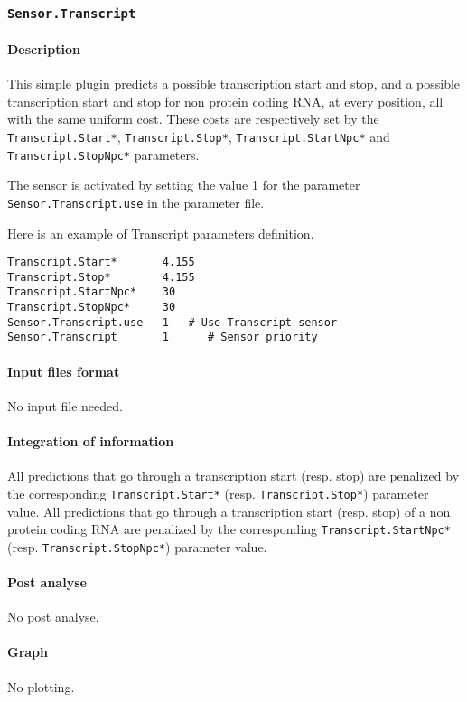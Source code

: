 
\subsubsection{\texttt{Sensor.Transcript}}

\paragraph{Description}

This simple plugin predicts a possible transcription start and stop, 
and a possible transcription start and stop for non protein coding RNA, at
every position, all with the same uniform cost. These costs are
respectively set by the \texttt{Transcript.Start*}, 
\texttt{Transcript.Stop*}, \texttt{Transcript.StartNpc*} and 
\texttt{Transcript.StopNpc*} parameters. 

The sensor is activated by setting the value 1 for the parameter
\texttt{Sensor.Transcript.use} in the parameter file. 

Here is an example of Transcript parameters definition.
\begin{Verbatim}[fontsize=\small]
Transcript.Start*       4.155
Transcript.Stop*        4.155
Transcript.StartNpc*    30
Transcript.StopNpc*     30
Sensor.Transcript.use   1   # Use Transcript sensor
Sensor.Transcript       1      # Sensor priority
\end{Verbatim}

\paragraph{Input files format}

No input file needed.

\paragraph{Integration of information}

All predictions that go through a transcription start (resp. stop) are
penalized by the corresponding \texttt{Transcript.Start*} (resp. 
\texttt{Transcript.Stop*}) parameter value.
All predictions that go through a transcription start (resp. stop) of a non protein coding RNA are
penalized by the corresponding \texttt{Transcript.StartNpc*} (resp. 
\texttt{Transcript.StopNpc*}) parameter value.

\paragraph{Post analyse}

No post analyse.

\paragraph{Graph}

No plotting.




